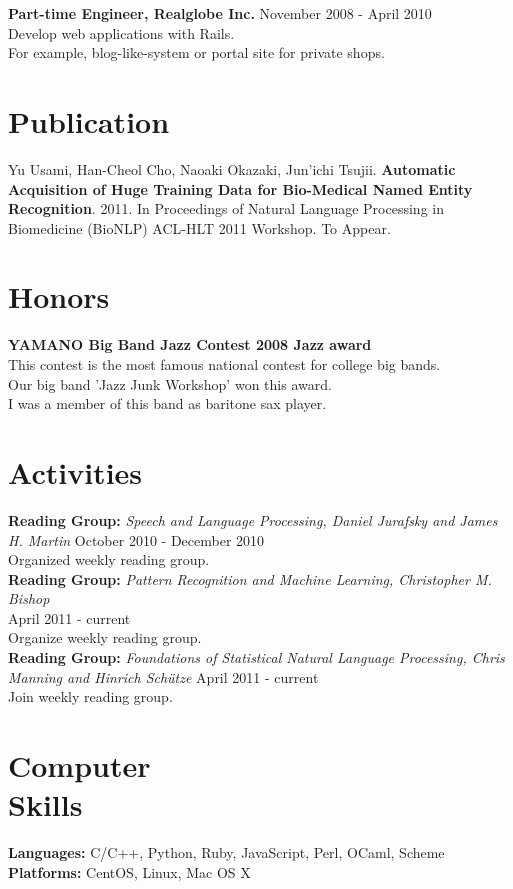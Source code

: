 \documentclass[margin]{res}
\begin{document}
\begin{resume}
\textbf{Part-time Engineer, Realglobe Inc.} \hfill November 2008 - April 2010\\
Develop web applications with Rails.\\
For example, blog-like-system or portal site for private shops.

\section{Publication}
Yu Usami, Han-Cheol Cho, Naoaki Okazaki, Jun'ichi Tsujii. \textbf{Automatic Acquisition of Huge Training Data for Bio-Medical Named Entity Recognition}. 
2011. In Proceedings of Natural Language Processing in Biomedicine (BioNLP) ACL-HLT 2011 Workshop. To Appear.

\section{Honors}
\textbf{YAMANO Big Band Jazz Contest 2008 Jazz award} \\
This contest is the most famous national contest for college big bands.\\
Our big band 'Jazz Junk Workshop' won this award. \\
I was a member of this band as baritone sax player.

\section{Activities}
\textbf{Reading Group:} {\sl Speech and Language Processing, Daniel Jurafsky and James H. Martin} \hfill October 2010 - December 2010  \\
Organized weekly reading group. \\

\textbf{Reading Group:} {\sl Pattern Recognition and Machine Learning, Christopher M. Bishop} \\ \hfill April 2011 - current\\
Organize weekly reading group. \\

\textbf{Reading Group:} {\sl Foundations of Statistical Natural Language Processing, Chris Manning and Hinrich Schütze} \hfill April 2011 - current\\
Join weekly reading group.

\section{Computer \\ Skills}
\textbf{Languages:} C/C++, Python, Ruby, JavaScript, Perl, OCaml, Scheme \\
\textbf{Platforms:} CentOS, Linux, Mac OS X \\ 


\end{resume}
\end{document}
